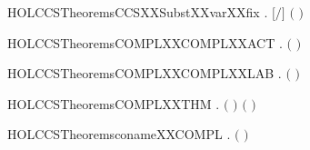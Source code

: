 \newcommand{\HOLCCSTheoremsCCSXXSubstXXvar}{\UseVerbatim{HOLCCSTheoremsCCSXXSubstXXvar}}
\begin{SaveVerbatim}{HOLCCSTheoremsCCSXXSubstXXvarXXfix}
\HOLTokenTurnstile{} \HOLSymConst{\HOLTokenForall{}} . \ensuremath{[}\ensuremath{/}\ensuremath{]} \ensuremath{(} \ensuremath{)} \HOLSymConst{\ensuremath{=}} 
\end{SaveVerbatim}
\newcommand{\HOLCCSTheoremsCCSXXSubstXXvarXXfix}{\UseVerbatim{HOLCCSTheoremsCCSXXSubstXXvarXXfix}}
\begin{SaveVerbatim}{HOLCCSTheoremsCOMPLXXCOMPLXXACT}
\HOLTokenTurnstile{} \HOLSymConst{\HOLTokenForall{}}.  \ensuremath{(} \ensuremath{)} \HOLSymConst{\ensuremath{=}} 
\end{SaveVerbatim}
\newcommand{\HOLCCSTheoremsCOMPLXXCOMPLXXACT}{\UseVerbatim{HOLCCSTheoremsCOMPLXXCOMPLXXACT}}
\begin{SaveVerbatim}{HOLCCSTheoremsCOMPLXXCOMPLXXLAB}
\HOLTokenTurnstile{} \HOLSymConst{\HOLTokenForall{}}.  \ensuremath{(} \ensuremath{)} \HOLSymConst{\ensuremath{=}} 
\end{SaveVerbatim}
\newcommand{\HOLCCSTheoremsCOMPLXXCOMPLXXLAB}{\UseVerbatim{HOLCCSTheoremsCOMPLXXCOMPLXXLAB}}
\begin{SaveVerbatim}{HOLCCSTheoremsCOMPLXXTHM}
\HOLTokenTurnstile{} \HOLSymConst{\HOLTokenForall{}} .
       \ensuremath{(} \HOLSymConst{\HOLTokenNotEqual{}}   \HOLSymConst{\HOLTokenImp{}}   \HOLSymConst{\HOLTokenNotEqual{}}  \ensuremath{)} \HOLSymConst{\HOLTokenConj{}}
       \ensuremath{(} \HOLSymConst{\HOLTokenNotEqual{}}   \HOLSymConst{\HOLTokenImp{}}   \HOLSymConst{\HOLTokenNotEqual{}}  \ensuremath{)}
\end{SaveVerbatim}
\newcommand{\HOLCCSTheoremsCOMPLXXTHM}{\UseVerbatim{HOLCCSTheoremsCOMPLXXTHM}}
\begin{SaveVerbatim}{HOLCCSTheoremsconameXXCOMPL}
\HOLTokenTurnstile{} \HOLSymConst{\HOLTokenForall{}}.   \HOLSymConst{\ensuremath{=}}  \ensuremath{(} \ensuremath{)}
\end{SaveVerbatim}
